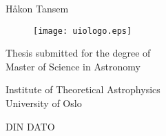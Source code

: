 \begin{titlepage}
\begin{center}

\bfseries
\huge%
\mintittel

\vspace{2cm}
\LARGE
Håkon Tansem


\vspace{1cm}
\begin{figure}[h]
\centering
\texttt{[image: uiologo.eps]}
\centering
\end{figure}
\vspace{3cm}
\Large
Thesis submitted for the degree of \\
Master of Science in Astronomy%

\vspace{0.8cm}
\large
Institute of Theoretical Astrophysics\\
University of Oslo

\vspace{0.8cm}
DIN DATO

\end{center}
\normalfont

\end{titlepage}
